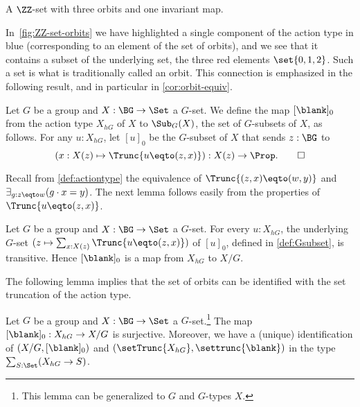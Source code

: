 \begin{marginfigure}
  \caption{A $\ZZ$-set with three orbits and one invariant map.}
  \label{fig:ZZ-set-orbits}
\end{marginfigure}

In~\cref{fig:ZZ-set-orbits} we have highlighted a single component of
the action type in blue (\ie corresponding to an element of the set of orbits),
and we see that it contains a subset of the underlying set,
the three red elements $\set{0,1,2}$.
Such a set is what is traditionally called an orbit.
This connection is emphasized in the following result,
and in particular in \cref{cor:orbit-equiv}.

\begin{definition}\label{def:orbit-map}
Let $G$ be a group and $X : \BG\to\Set$ a $G$-set.
We define the map $[\blank]_0$ from the action type $X_{hG}$ of
$X$ to $\Sub_G(X)$, the set of $G$-subsets of $X$, as follows.
For any $u:X_{hG}$, let $[u]_0$ be the $G$-subset of $X$ that
sends $z:\BG$ to
\[
(x:X(z) \mapsto \Trunc{u\eqto(z,x)}) : X(z) \to \Prop.\qedhere
\]
\end{definition}

Recall from \cref{def:actiontype} the equivalence of
$\Trunc{(z,x)\eqto(w,y)}$ and $\exists_{g:z\eqto w}(g\cdot x = y)$.
The next lemma follows easily from the properties of $\Trunc{u\eqto(z,x)}$.

\begin{lemma}\label{lem:[]0-maps-to-X/G}
Let $G$ be a group and $X : \BG\to\Set$ a $G$-set.
For every $u:X_{hG}$, the underlying $G$-set
$(z\mapsto \sum_{x:X(z)}\Trunc{u\eqto(z,x)})$ of $[u]_0$,
defined in \cref{def:Gsubset}, is transitive.
Hence $[\blank]_0$ is a map from $X_{hG}$ to $X/G$. 
\end{lemma}

The following lemma implies that the set of orbits can 
be identified with the set truncation of the action type.

\begin{lemma}\label{lem:X/G=setTruncX_hGs}
  Let $G$ be a group and $X : \BG\to\Set$ a $G$-set.\footnote{%
  This lemma can be generalized to \inftygps $G$ and $G$-types $X$.}
  The map $[\blank]_0 :X_{hG}\to X/G $ is surjective.
  Moreover, we have a (unique) identification of
  $(X/G,[\blank]_0)$ and $(\setTrunc{X_{hG}},\settrunc{\blank})$
  in the type $\sum_{S:\Set}(X_{hG}\to S)$.
\end{lemma}


